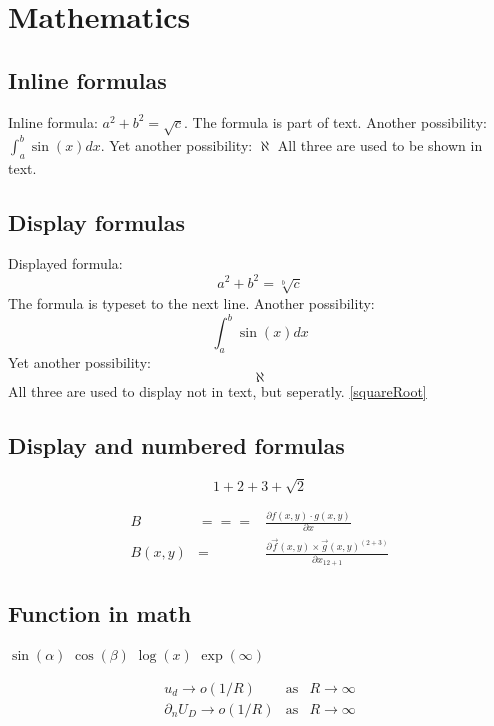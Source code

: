 \documentclass[a4paper]{article}
\begin{document}
    \section{Mathematics}
    \subsection{Inline formulas}
    Inline formula:
    $a^2+b^2=\sqrt{c}$. The formula is part of text. Another possibility: 
    \(\int_a^b\sin(x)dx\). Yet another possibility:
    \begin{math}
        \aleph
    \end{math}
    All three are used to be shown in text.

    \subsection{Display formulas}
    Displayed formula:
    $$a^2+b^2=\sqrt[b]{c}$$ The formula is typeset to the next line. Another possibility: 
    \[\int_a^b\sin(x)dx\] Yet another possibility:
    \begin{displaymath}
        \aleph
    \end{displaymath}
    All three are used to display not in text, but seperatly.
    \ref{squareRoot} %

    \subsection{Display and numbered formulas}
    \begin{equation}
        1+2+3+\sqrt{2} \label{squareRoot}
    \end{equation}

    \begin{eqnarray}
        B&===&\frac{\partial f(x,y)\cdot g(x,y)}{\partial x}\\
        B(x,y)&=&\frac{\partial \vec{f}(x,y)
        \times\vec{g}(x,y)^{(2+3)}}{\partial x_{12+1}}
    \end{eqnarray}

    \subsection{Function in math}
    $\sin(\alpha)$
    $\cos(\beta)$
    $\log(x)$
    $\exp(\infty)$

    \begin{eqnarray}
        u_d\to o(1/R)&\text{as}&R\to\infty\nonumber\\
        \partial_n U_D\to o(1/R)&\text{as}&R\to\infty
    \end{eqnarray}
\end{document}
